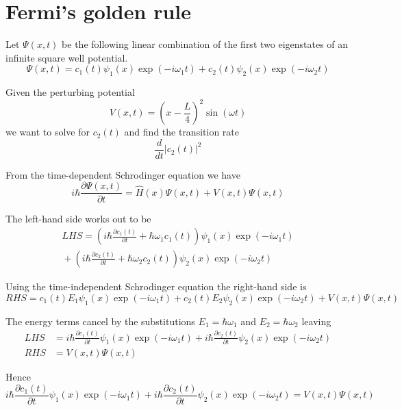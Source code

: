\documentclass[12pt]{article}
\begin{document}
\section*{Fermi's golden rule}

Let $\Psi(x,t)$ be the following linear combination of the first two eigenstates
of an infinite square well potential.
\begin{equation*}
\Psi(x,t)=c_1(t)\psi_1(x)\exp(-i\omega_1t)+c_2(t)\psi_2(x)\exp(-i\omega_2t)
\end{equation*}

Given the perturbing potential
\begin{equation*}
V(x,t)=\left(x-\frac{L}{4}\right)^2\sin(\omega t)
\end{equation*}
we want to solve for $c_2(t)$ and find the transition rate
\begin{equation*}
\frac{d}{dt}|c_2(t)|^2
\end{equation*}

From the time-dependent Schrodinger equation we have
\begin{equation*}
i\hbar\frac{\partial\Psi(x,t)}{\partial t}=\hat H(x)\Psi(x,t)+V(x,t)\Psi(x,t)
\end{equation*}

The left-hand side works out to be
\begin{multline*}
LHS=\left(i\hbar\frac{\partial c_1(t)}{\partial t}+\hbar\omega_1c_1(t)\right)
\psi_1(x)\exp(-i\omega_1t)
\\
{}+\left(i\hbar\frac{\partial c_2(t)}{\partial t}+\hbar\omega_2c_2(t)\right)
\psi_2(x)\exp(-i\omega_2t)
\end{multline*}

Using the time-independent Schrodinger equation the right-hand side is
\begin{equation*}
RHS=c_1(t)E_1\psi_1(x)\exp(-i\omega_1t)
+c_2(t)E_2\psi_2(x)\exp(-i\omega_2t)
+V(x,t)\Psi(x,t)
\end{equation*}

The energy terms cancel by the substitutions
$E_1=\hbar\omega_1$ and $E_2=\hbar\omega_2$ leaving
\begin{align*}
LHS&=i\hbar\frac{\partial c_1(t)}{\partial t}\psi_1(x)\exp(-i\omega_1t)
+i\hbar\frac{\partial c_2(t)}{\partial t}\psi_2(x)\exp(-i\omega_2t)
\\
RHS&=V(x,t)\Psi(x,t)
\end{align*}

Hence
\begin{equation*}
i\hbar\frac{\partial c_1(t)}{\partial t}\psi_1(x)\exp(-i\omega_1t)
+i\hbar\frac{\partial c_2(t)}{\partial t}\psi_2(x)\exp(-i\omega_2t)
=V(x,t)\Psi(x,t)
\end{equation*}
\end{document}
